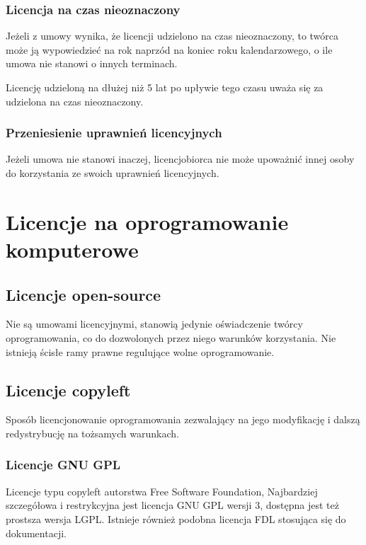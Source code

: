 \documentclass{article}
\begin{document}
\subsubsection{Licencja na czas nieoznaczony}

Jeżeli z umowy wynika, że licencji udzielono na czas nieoznaczony, to twórca może ją wypowiedzieć na rok naprzód na koniec roku kalendarzowego, o ile umowa nie stanowi o innych terminach.

Licencję udzieloną na dłużej niż 5 lat po upływie tego czasu uważa się za udzielona na czas nieoznaczony.

\subsubsection{Przeniesienie uprawnień licencyjnych}

Jeżeli umowa nie stanowi inaczej, licencjobiorca nie może upoważnić innej osoby do korzystania ze swoich uprawnień licencyjnych.

\section{Licencje na oprogramowanie komputerowe}

\subsection{Licencje open-source}

Nie są umowami licencyjnymi, stanowią jedynie oświadczenie twórcy oprogramowania, co do dozwolonych przez niego warunków korzystania. Nie istnieją ścisłe ramy prawne regulujące wolne oprogramowanie.

\subsection{Licencje copyleft}

Sposób licencjonowanie oprogramowania zezwalający na jego modyfikację i dalszą redystrybucję na tożsamych warunkach.

\subsubsection{Licencje GNU GPL}

Licencje typu copyleft autorstwa Free Software Foundation, Najbardziej szczegółowa i restrykcyjna jest licencja GNU GPL wersji 3, dostępna jest też prostsza wersja LGPL.
Istnieje również podobna licencja FDL stosująca się do dokumentacji.
\end{document}
